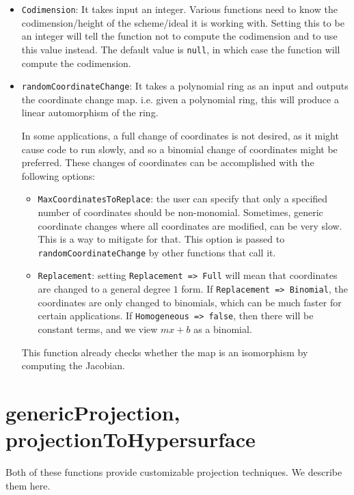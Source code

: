 \documentclass[11pt]{amsart}
\theoremstyle{definition}
\begin{document}
\begin{itemize}
	\item {\tt Codimension}: It takes input an integer. Various functions need to know the codimension/height of the scheme/ideal it is working with.  Setting this to be an integer will tell the function not to compute the codimension and to use this value instead.  The default value is {\tt null}, in which case the function will compute the codimension.
	
	
	\item {\tt randomCoordinateChange}: It takes a polynomial ring as an input and outputs the coordinate change map. 
	i.e. given a polynomial ring, this will produce a linear automorphism of the ring. 
	
	In some applications, a full change of coordinates is not desired, as it might cause code to run slowly, and so a binomial change of coordinates might be preferred.  
	These changes of coordinates can be accomplished with the following options:
	
	\begin{itemize}
		\item {\tt MaxCoordinatesToReplace}: the user can specify that only a specified number of coordinates should be non-monomial.  Sometimes, generic coordinate changes where all coordinates are modified, can be very slow.  This is a way to mitigate for that.
		This option is passed to {\tt randomCoordinateChange} by other functions that call it. 
		
		\item {\tt Replacement}: setting {\tt Replacement => Full} will mean that coordinates are changed to a general degree $1$ form.  If {\tt Replacement => Binomial}, the coordinates are only changed to binomials, which can be much faster for certain applications. If {\tt Homogeneous => false}, then there will be constant terms, and we view $mx + b$ as a binomial.
	\end{itemize} 
	
	  This function already checks whether the map is an isomorphism by computing the Jacobian.
\end{itemize}

\section{genericProjection, projectionToHypersurface}\label{projectionfunctions}

Both of these functions provide customizable projection techniques. We describe them here. 
\end{document}
